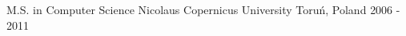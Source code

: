 

\begin{cventries}

  \cventry
    {M.S. in Computer Science} %
    {Nicolaus Copernicus University} %
    {Toruń, Poland} %
    {2006 - 2011} %
    {
      \begin{cvitems} %
      \end{cvitems}
    }

\end{cventries}
